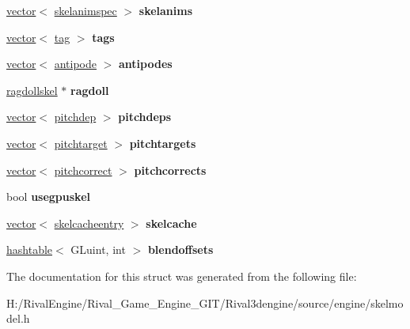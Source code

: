 \begin{DoxyCompactItemize}
\hyperlink{structvector}{vector}$<$ \hyperlink{structskelmodel_1_1skelanimspec}{skelanimspec} $>$ {\bfseries skelanims}
\item 
\mbox{\label{structskelmodel_1_1skeleton_a49295e3a60ce15fe09be8ef618ecf44e}} 
\hyperlink{structvector}{vector}$<$ \hyperlink{structskelmodel_1_1tag}{tag} $>$ {\bfseries tags}
\item 
\mbox{\label{structskelmodel_1_1skeleton_a8b6727f2110f85189778ce5f53ddf98b}} 
\hyperlink{structvector}{vector}$<$ \hyperlink{structskelmodel_1_1antipode}{antipode} $>$ {\bfseries antipodes}
\item 
\mbox{\label{structskelmodel_1_1skeleton_a495e95255c5db26a298cd8e5b2f347f7}} 
\hyperlink{structragdollskel}{ragdollskel} $\ast$ {\bfseries ragdoll}
\item 
\mbox{\label{structskelmodel_1_1skeleton_afffb80504cf292295fd63483bc89aa4a}} 
\hyperlink{structvector}{vector}$<$ \hyperlink{structskelmodel_1_1pitchdep}{pitchdep} $>$ {\bfseries pitchdeps}
\item 
\mbox{\label{structskelmodel_1_1skeleton_a946acbc1bbf8ac490f82df8bb14ccd3f}} 
\hyperlink{structvector}{vector}$<$ \hyperlink{structskelmodel_1_1pitchtarget}{pitchtarget} $>$ {\bfseries pitchtargets}
\item 
\mbox{\label{structskelmodel_1_1skeleton_a1db03e8c9830e62eec019afa5ed84c4e}} 
\hyperlink{structvector}{vector}$<$ \hyperlink{structskelmodel_1_1pitchcorrect}{pitchcorrect} $>$ {\bfseries pitchcorrects}
\item 
\mbox{\label{structskelmodel_1_1skeleton_ab958f42dfcc59ddfcc4bfc8a1f131e34}} 
bool {\bfseries usegpuskel}
\item 
\mbox{\label{structskelmodel_1_1skeleton_aa4fd2fb6b471b4d7268268ed832c9382}} 
\hyperlink{structvector}{vector}$<$ \hyperlink{structskelmodel_1_1skelcacheentry}{skelcacheentry} $>$ {\bfseries skelcache}
\item 
\mbox{\label{structskelmodel_1_1skeleton_a44be5efedf462ea0caf024290df232ea}} 
\hyperlink{structhashtable}{hashtable}$<$ G\+Luint, int $>$ {\bfseries blendoffsets}
\end{DoxyCompactItemize}


The documentation for this struct was generated from the following file\+:\begin{DoxyCompactItemize}
\item 
H\+:/\+Rival\+Engine/\+Rival\+\_\+\+Game\+\_\+\+Engine\+\_\+\+G\+I\+T/\+Rival3dengine/source/engine/skelmodel.\+h\end{DoxyCompactItemize}
